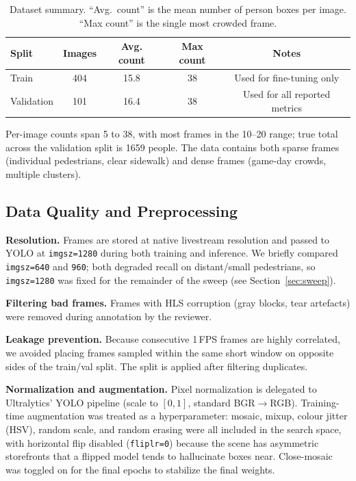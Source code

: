 \documentclass{article}
\begin{document}
\begin{table}[h]
    \centering
    \caption{Dataset summary. ``Avg.\ count'' is the mean number of
    person boxes per image. ``Max count'' is the single most
    crowded frame.}
    \label{tab:dataset_summary}
    \begin{tabular}{lcccc}
        \toprule
        Split & Images & Avg. count & Max count & Notes \\
        \midrule
        Train & 404 & 15.8 & 38 & Used for fine-tuning only \\
        Validation & 101 & 16.4 & 38 & Used for all reported metrics \\
        \bottomrule
    \end{tabular}
\end{table}

Per-image counts span 5 to 38, with most frames in the 10--20
range; true total across the validation split is 1659 people. The
data contains both sparse frames (individual pedestrians, clear
sidewalk) and dense frames (game-day crowds, multiple clusters).

\subsection{Data Quality and Preprocessing}
\textbf{Resolution.} Frames are stored at native livestream
resolution and passed to YOLO at \texttt{imgsz=1280} during both
training and inference. We briefly compared \texttt{imgsz=640} and
\texttt{960}; both degraded recall on distant/small pedestrians, so
\texttt{imgsz=1280} was fixed for the remainder of the sweep (see
Section~\ref{sec:sweep}).

\textbf{Filtering bad frames.} Frames with HLS corruption (gray
blocks, tear artefacts) were removed during annotation by the
reviewer.

\textbf{Leakage prevention.} Because consecutive 1\,FPS frames are
highly correlated, we avoided placing frames sampled within the
same short window on opposite sides of the train/val split. The
split is applied after filtering duplicates.

\textbf{Normalization and augmentation.} Pixel normalization is
delegated to Ultralytics' YOLO pipeline (scale to $[0,1]$, standard
BGR$\to$RGB). Training-time augmentation was treated as a
hyperparameter: mosaic, mixup, colour jitter (HSV), random scale,
and random erasing were all included in the search space, with
horizontal flip disabled (\texttt{fliplr=0}) because the scene has
asymmetric storefronts that a flipped model tends to hallucinate
boxes near. Close-mosaic was toggled on for the final epochs to
stabilize the final weights.
\end{document}
